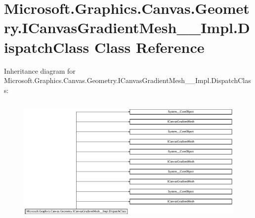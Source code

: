 \hypertarget{class_microsoft_1_1_graphics_1_1_canvas_1_1_geometry_1_1_i_canvas_gradient_mesh_____impl_1_1_dispatch_class}{}\section{Microsoft.\+Graphics.\+Canvas.\+Geometry.\+I\+Canvas\+Gradient\+Mesh\+\_\+\+\_\+\+Impl.\+Dispatch\+Class Class Reference}
\label{class_microsoft_1_1_graphics_1_1_canvas_1_1_geometry_1_1_i_canvas_gradient_mesh_____impl_1_1_dispatch_class}
Inheritance diagram for Microsoft.\+Graphics.\+Canvas.\+Geometry.\+I\+Canvas\+Gradient\+Mesh\+\_\+\+\_\+\+Impl.\+Dispatch\+Class\+:\begin{figure}[H]
\begin{center}
\leavevmode
\includegraphics[height=6.390041cm]{class_microsoft_1_1_graphics_1_1_canvas_1_1_geometry_1_1_i_canvas_gradient_mesh_____impl_1_1_dispatch_class}
\end{center}
\end{figure}
